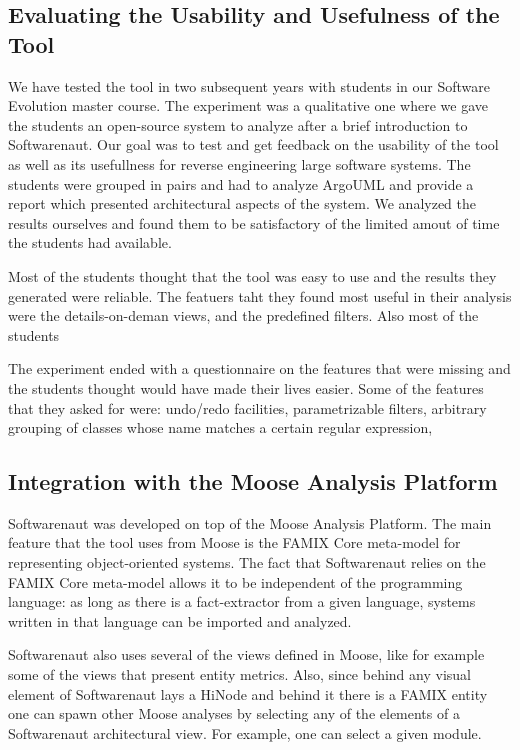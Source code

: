 \documentclass[preprint,12pt]{elsarticle}
\begin{document}
\subsection {Evaluating the Usability and Usefulness of the Tool}
We have tested the tool in two subsequent years with students in our Software Evolution master course. The experiment was a qualitative one where we gave the students an open-source system to analyze after a brief introduction to Softwarenaut. Our goal was to test and get feedback on the usability of the tool as well as its usefullness for reverse engineering large software systems. The students were grouped in pairs and had to analyze ArgoUML and provide a report which presented architectural aspects of the system. We analyzed the results ourselves and found them to be satisfactory of the limited amout of time the students had available. 

Most of the students thought that the tool was easy to use and the results they generated were reliable. The featuers taht they found most useful in their analysis were the details-on-deman views, and the predefined filters. Also most of the students 

The experiment ended with a questionnaire on the features that were missing and the students thought would have made their lives easier. Some of the features that they asked for were: undo/redo facilities, parametrizable filters, arbitrary grouping of classes whose name matches a certain regular expression, 

\subsection {Integration with the Moose Analysis Platform}
Softwarenaut was developed on top of the Moose Analysis Platform. The main feature that the tool uses from Moose is the FAMIX Core meta-model for representing object-oriented systems. The fact that Softwarenaut relies on the FAMIX Core meta-model allows it to be independent of the programming language: as long as there is a fact-extractor from a given language, systems written in that language can be imported and analyzed. 

Softwarenaut also uses several of the views defined in Moose, like for example some of the views that present entity metrics. Also, since behind any visual element of Softwarenaut lays a HiNode and behind it there is a FAMIX entity one can spawn other Moose analyses by selecting any of the elements of a Softwarenaut architectural view. For example, one can select a given module.
\end{document}
